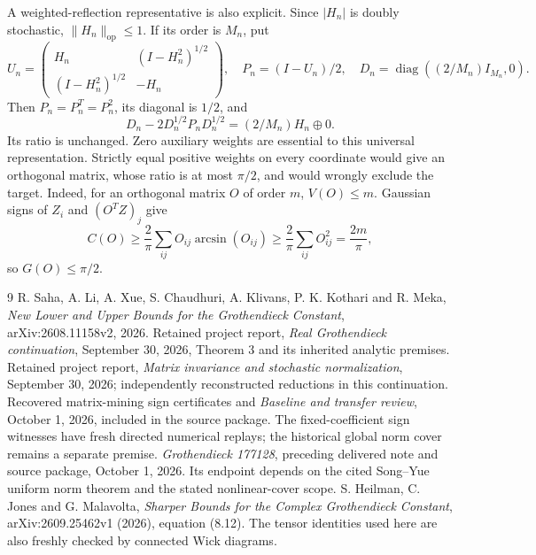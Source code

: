 \documentclass[11pt]{article}
\newcommand{\norm}[1]{\lVert #1\rVert}
\begin{document}
A weighted-reflection representative is also explicit. Since $|H_n|$
is doubly stochastic, $\norm{H_n}_{\mathrm{op}}\le1$. If its order is
$M_n$, put
\[
 U_n=\begin{pmatrix}H_n&(I-H_n^2)^{1/2}\\
                     (I-H_n^2)^{1/2}&-H_n\end{pmatrix},\quad
 P_n=(I-U_n)/2,\quad D_n=\operatorname{diag}((2/M_n)I_{M_n},0).
\]
Then $P_n=P_n^T=P_n^2$, its diagonal is $1/2$, and
\[
 D_n-2D_n^{1/2}P_nD_n^{1/2}=(2/M_n)H_n\oplus0.
\]
Its ratio is unchanged. Zero auxiliary weights are essential to this
universal representation. Strictly equal positive weights on every
coordinate would give an orthogonal matrix, whose ratio is at most
$\pi/2$, and would wrongly exclude the target. Indeed, for an orthogonal matrix $O$ of order $m$, $V(O)\le m$.
Gaussian signs of $Z_i$ and $(O^TZ)_j$ give
\[
 C(O)\ge\frac2\pi\sum_{ij}O_{ij}\arcsin(O_{ij})
 \ge\frac2\pi\sum_{ij}O_{ij}^2=\frac{2m}\pi,
\]
so $G(O)\le\pi/2$.

\begin{thebibliography}{9}
 R. Saha, A. Li, A. Xue, S. Chaudhuri, A. Klivans,
P. K. Kothari and R. Meka, \emph{New Lower and Upper Bounds for the
Grothendieck Constant}, arXiv:2608.11158v2, 2026.
 Retained project report,
\emph{Real Grothendieck continuation}, September 30, 2026,
Theorem 3 and its inherited analytic premises.
 Retained project report,
\emph{Matrix invariance and stochastic normalization}, September 30,
2026; independently reconstructed reductions in this continuation.
 Recovered matrix-mining sign certificates and
 \emph{Baseline and transfer review}, October 1, 2026, included in the
source package. The fixed-coefficient sign witnesses have fresh directed numerical replays;
the historical global norm cover remains a separate premise.
 \emph{Grothendieck 177128}, preceding delivered
note and source package, October 1, 2026. Its endpoint depends on the
cited Song--Yue uniform norm theorem and the stated nonlinear-cover scope.
 S. Heilman, C. Jones and G. Malavolta,
\emph{Sharper Bounds for the Complex Grothendieck Constant},
arXiv:2609.25462v1 (2026), equation (8.12). The tensor identities used
here are also freshly checked by connected Wick diagrams.
\end{thebibliography}

\appendix
\end{document}
